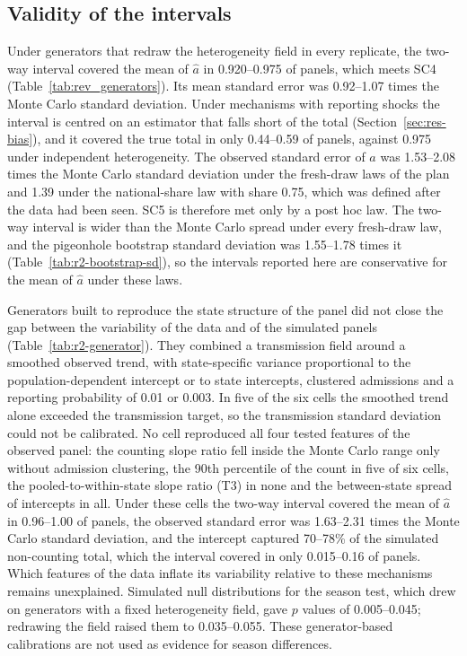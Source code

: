 \subsection{Validity of the intervals}
\label{sec:res-validity}

Under generators that redraw the heterogeneity field in every replicate, the two-way interval covered the mean of $\hat a$ in 0.920--0.975 of panels, which meets SC4 (Table~\ref{tab:rev_generators}). Its mean standard error was 0.92--1.07 times the Monte Carlo standard deviation. Under mechanisms with reporting shocks the interval is centred on an estimator that falls short of the total (Section~\ref{sec:res-bias}), and it covered the true total in only 0.44--0.59 of panels, against 0.975 under independent heterogeneity. The observed standard error of $a$ was 1.53--2.08 times the Monte Carlo standard deviation under the fresh-draw laws of the plan and 1.39 under the national-share law with share 0.75, which was defined after the data had been seen. SC5 is therefore met only by a post hoc law. The two-way interval is wider than the Monte Carlo spread under every fresh-draw law, and the pigeonhole bootstrap standard deviation was 1.55--1.78 times it (Table~\ref{tab:r2-bootstrap-sd}), so the intervals reported here are conservative for the mean of $\hat a$ under these laws.

Generators built to reproduce the state structure of the panel did not close the gap between the variability of the data and of the simulated panels (Table~\ref{tab:r2-generator}). They combined a transmission field around a smoothed observed trend, with state-specific variance proportional to the population-dependent intercept or to state intercepts, clustered admissions and a reporting probability of 0.01 or 0.003. In five of the six cells the smoothed trend alone exceeded the transmission target, so the transmission standard deviation could not be calibrated. No cell reproduced all four tested features of the observed panel: the counting slope ratio fell inside the Monte Carlo range only without admission clustering, the 90th percentile of the count in five of six cells, the pooled-to-within-state slope ratio (T3) in none and the between-state spread of intercepts in all. Under these cells the two-way interval covered the mean of $\hat a$ in 0.96--1.00 of panels, the observed standard error was 1.63--2.31 times the Monte Carlo standard deviation, and the intercept captured 70--78\% of the simulated non-counting total, which the interval covered in only 0.015--0.16 of panels. Which features of the data inflate its variability relative to these mechanisms remains unexplained. Simulated null distributions for the season test, which drew on generators with a fixed heterogeneity field, gave $p$ values of 0.005--0.045; redrawing the field raised them to 0.035--0.055. These generator-based calibrations are not used as evidence for season differences.


